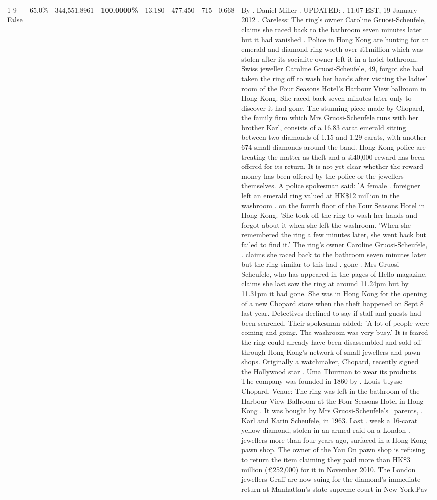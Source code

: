 \begin{table}[H]
\begin{tabular}{lllrlllll}
\cline{1-9}
False & 65.0\% & 344,551.8961 & \bfseries \color{red} 100.0000\% & 13.180 & 477.450 & 715 & 0.668 & By . Daniel Miller . UPDATED: . 11:07 EST, 19 January 2012 . Careless: The ring's owner Caroline Gruosi-Scheufele, claims she raced back to the bathroom seven minutes later but it had vanished . Police in Hong Kong are hunting for an emerald and diamond ring worth over £1million which was stolen after its socialite owner left it in a hotel bathroom. Swiss jeweller Caroline Gruosi-Scheufele, 49, forgot she had taken the ring off to wash her hands after visiting the ladies' room of the Four Seasons Hotel's Harbour View ballroom in Hong Kong. She raced back seven minutes later only to discover it had gone. The stunning piece made by Chopard, the family firm which Mrs Gruosi-Scheufele runs with her brother Karl, consists of a 16.83 carat emerald sitting between two diamonds of 1.15 and 1.29 carats, with another 674 small diamonds around the band. Hong Kong police are treating the matter as theft and a £40,000 reward has been offered for its return. It is not yet clear whether the reward money has been offered by the police or the jewellers themselves. A police spokesman said: 'A female . foreigner left an emerald ring valued at HK\$12 million in the washroom . on the fourth floor of the Four Seasons Hotel in Hong Kong. 'She took off the ring to wash her hands and forgot about it when she left the washroom. 'When she remembered the ring a few minutes later, she went back but failed to find it.' The ring's owner Caroline Gruosi-Scheufele, . claims she raced back to the bathroom seven minutes later but the ring similar to this had . gone . Mrs Gruosi-Scheufele, who has appeared in the pages of Hello magazine, claims she last saw the ring at around 11.24pm but by 11.31pm it had gone. She was in Hong Kong for the opening of a new Chopard store when the theft happened on Sept 8 last year. Detectives declined to say if staff and guests had been searched. Their spokesman added: 'A lot of people were coming and going. The washroom was very busy.' It is feared the ring could already have been disassembled and sold off through Hong Kong's network of small jewellers and pawn shops. Originally a watchmaker, Chopard, recently signed the Hollywood star . Uma Thurman to wear its products. The company was founded in 1860 by . Louis-Ulysse Chopard. Venue: The ring was left in the bathroom of the Harbour View Ballroom at the Four Seasons Hotel in Hong Kong . It was bought by Mrs Gruosi-Scheufele's  parents, . Karl and Karin Scheufele, in 1963. Last . week a 16-carat yellow diamond, stolen in an armed raid on a London . jewellers more than four years ago, surfaced in a Hong Kong pawn shop. The owner of the Yau On pawn shop is refusing to return the item claiming they paid more than HK\$3 million (£252,000) for it in November 2010. The London jewellers Graff are now suing for the diamond’s immediate return at Manhattan’s state supreme court in New York.Pav \\

\end{tabular}
\end{table}
